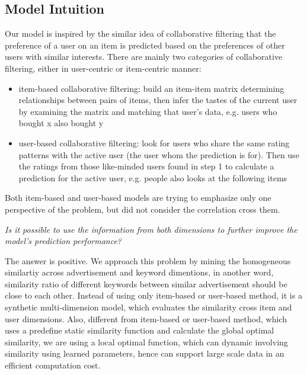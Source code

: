 \subsection{Model Intuition} 
\label{sec:intuition}

Our model is inspired by the similar idea of collaborative filtering
that the preference of a user on an item is predicted based on the
preferences of other users with similar interests.  There are mainly
two categories of collaborative filtering, either in user-centric or
item-centric manner:
\begin{itemize}
\item item-based collaborative filtering: build an item-item matrix
  determining relationships between pairs of items, then infer the
  tastes of the current user by examining the matrix and matching that
  user's data, e.g. users who bought x also bought y
\item user-based collaborative filtering: look for users who share the
  same rating patterns with the active user (the user whom the
  prediction is for). Then use the ratings from those like-minded
  users found in step 1 to calculate a prediction for the active user,
  e.g. people also looks at the following items
\end{itemize}
Both item-based and user-based models are trying to emphasize only one
perspective of the problem, but did not consider the correlation cross
them.

\textit{ Is it possible to use the information from both dimensions to
  further improve the model's prediction performance? }

The answer is positive. We approach this problem by mining the
homogeneous similartiy across advertisement and keyword dimentions, in
another word, similarity ratio of different keywords between similar
advertisement should be close to each other.  Instead of using only
item-based or user-based method, it is a synthetic multi-dimension
model, which evaluates the similarity cross item and user
dimensions. Also, different from item-based or user-based method,
which uses a predefine static similarity function and calculate the
global optimal similarity, we are using a local optimal function,
which can dynamic involving similarity using learned parameters, hence
can support large scale data in an efficient computation cost.


